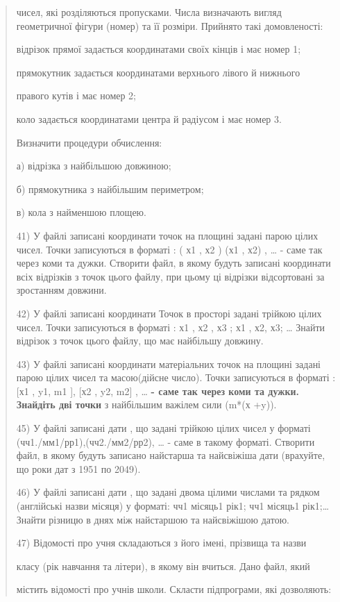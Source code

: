 \documentclass[]{article}
\begin{document}
\begin{quote}
чисел, які розділяються пропусками. Числа визначають вигляд геометричної
фігури (номер) та її розміри. Прийнято такі домовленості:

відрізок прямої задається координатами своїх кінців і має номер 1;

прямокутник задається координатами верхнього лівого й нижнього

правого кутів і має номер 2;

коло задається координатами центра й радіусом і має номер 3.

Визначити процедури обчислення:

а) відрізка з найбільшою довжиною;

б) прямокутника з найбільшим периметром;

в) кола з найменшою площею.

41) У файлі записані координати точок на площині задані парою цілих
чисел. Точки записуються в форматі : ( х1 , х2 ) (х1 , х2) , \ldots{} -
саме так через коми та дужки. Створити файл, в якому будуть записані
координати всіх відрізків з точок цього файлу, при цьому ці відрізки
відсортовані за зростанням довжини.

42) У файлі записані координати Точок в просторі задані трійкою цілих
чисел. Точки записуються в форматі : х1 , х2 , х3 ; х1 , х2, х3;
\ldots{} Знайти відрізок з точок цього файлу, що має найбільшу довжину.

43) У файлі записані координати матеріальних точок на площині задані
парою цілих чисел та масою(дійсне число). Точки записуються в форматі :
{[}х1 , y1, m1 {]}, {[}х2 , y2, m2{]} , \ldots{} \textbf{- саме так
через коми та дужки. Знайдіть дві точки} з найбільшим важілем сили (m*(х
+y)).

45) У файлі записані дати , що задані трійкою цілих чисел у форматі
(чч1./мм1/рр1),(чч2./мм2/рр2), \ldots{} - саме в такому форматі.
Створити файл, в якому будуть записано найстарша та найсвіжіша дати
(врахуйте, що роки дат з 1951 по 2049).

46) У файлі записані дати , що задані двома цілими числами та рядком
(англійські назви місяця) у форматі: чч1 місяць1 рік1; чч1 місяць1
рік1;\ldots{} Знайти різницю в днях між найстаршою та найсвіжішою датою.

47) Відомості про учня складаються з його імені, прізвища та назви

класу (рік навчання та літери), в якому він вчиться. Дано файл, який

містить відомості про учнів школи. Скласти підпрограми, які дозволяють:


\end{quote}
\end{document}
